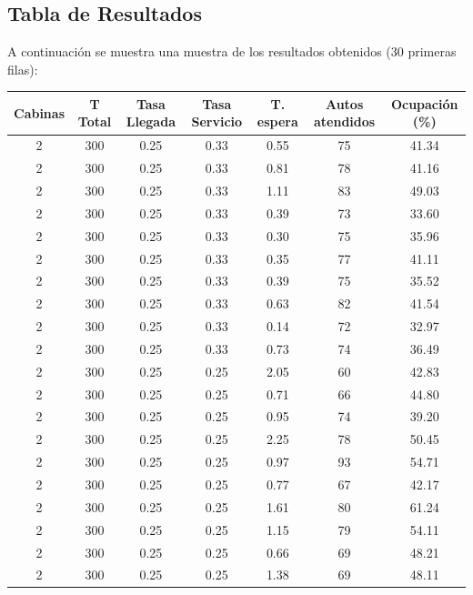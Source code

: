 \documentclass[12pt]{article}
\begin{document}
\newpage

\subsection*{Tabla de Resultados}
A continuación se muestra una muestra de los resultados obtenidos (30 primeras filas):

\begin{table}[H]
    \small
    \setlength{\tabcolsep}{3pt} %
    \renewcommand{\arraystretch}{1.2} %
    \begin{tabularx}{\textwidth}{|c|c|c|c|c|c|c|}
    \toprule
    Cabinas & T Total & Tasa Llegada & Tasa Servicio & T. espera & Autos atendidos & Ocupación (\%) \\
    \midrule
    2 & 300 & 0.25 & 0.33 & 0.55 & 75 & 41.34 \\
    2 & 300 & 0.25 & 0.33 & 0.81 & 78 & 41.16 \\
    2 & 300 & 0.25 & 0.33 & 1.11 & 83 & 49.03 \\
    2 & 300 & 0.25 & 0.33 & 0.39 & 73 & 33.60 \\
    2 & 300 & 0.25 & 0.33 & 0.30 & 75 & 35.96 \\
    2 & 300 & 0.25 & 0.33 & 0.35 & 77 & 41.11 \\
    2 & 300 & 0.25 & 0.33 & 0.39 & 75 & 35.52 \\
    2 & 300 & 0.25 & 0.33 & 0.63 & 82 & 41.54 \\
    2 & 300 & 0.25 & 0.33 & 0.14 & 72 & 32.97 \\
    2 & 300 & 0.25 & 0.33 & 0.73 & 74 & 36.49 \\
    2 & 300 & 0.25 & 0.25 & 2.05 & 60 & 42.83 \\
    2 & 300 & 0.25 & 0.25 & 0.71 & 66 & 44.80 \\
    2 & 300 & 0.25 & 0.25 & 0.95 & 74 & 39.20 \\
    2 & 300 & 0.25 & 0.25 & 2.25 & 78 & 50.45 \\
    2 & 300 & 0.25 & 0.25 & 0.97 & 93 & 54.71 \\
    2 & 300 & 0.25 & 0.25 & 0.77 & 67 & 42.17 \\
    2 & 300 & 0.25 & 0.25 & 1.61 & 80 & 61.24 \\
    2 & 300 & 0.25 & 0.25 & 1.15 & 79 & 54.11 \\
    2 & 300 & 0.25 & 0.25 & 0.66 & 69 & 48.21 \\
    2 & 300 & 0.25 & 0.25 & 1.38 & 69 & 48.11 \\

\end{tabularx}
\end{table}
\end{document}
